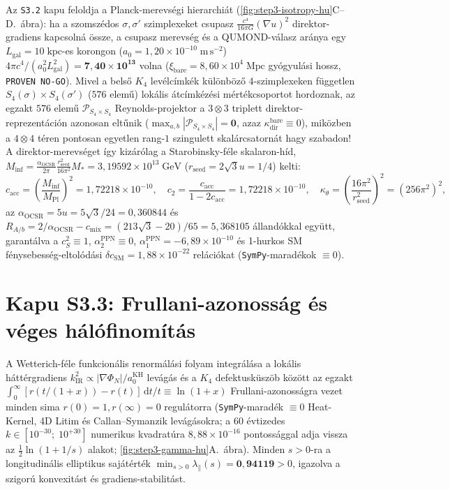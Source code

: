 \documentclass[11pt,a4paper]{article}
\begin{document}
Az \texttt{S3.2} kapu feloldja a Planck-merevségi hierarchiát (\ref{fig:step3-isotropy-hu}C--D.~ábra): ha a szomszédos $\sigma, \sigma'$ szimplexeket csupasz $\frac{c^4}{16\pi G}(\nabla u)^2$ direktor-gradiens kapcsolná össze, a csupasz merevség és a QUMOND-válasz aránya egy $L_{\mathrm{gal}} = 10\;\mathrm{kpc}$-es korongon ($a_0 = 1{,}20\times 10^{-10}\;\mathrm{m\,s^{-2}}$) $4\pi c^4/(a_0^2 L_{\mathrm{gal}}^2) = \mathbf{7{,}40\times 10^{13}}$ volna ($\xi_{\mathrm{bare}} = 8{,}60\times 10^4\;\mathrm{Mpc}$ gyógyulási hossz, \texttt{PROVEN NO-GO}). Mivel a belső $K_4$ levélcímkék különböző 4-szimplexeken független $S_4(\sigma)\times S_4(\sigma')$ ($576$ elemű) lokális átcímkézési mértékcsoportot hordoznak, az egzakt $576$ elemű $\mathcal{P}_{S_4\times S_4}$ Reynolds-projektor a $3\otimes 3$ triplett direktor-reprezentáción azonosan eltűnik ($\max_{a,b}|\mathcal{P}_{S_4\times S_4}| = \mathbf{0}$, azaz $\kappa_{\mathrm{dir}}^{\mathrm{bare}} \equiv 0$), miközben a $4\otimes 4$ téren pontosan egyetlen rang-$1$ szingulett skalárcsatornát hagy szabadon! A direktor-merevséget így kizárólag a Starobinsky-féle skalaron-híd, $M_{\mathrm{inf}} = \frac{\alpha_{\mathrm{OCSR}}}{2\pi}\frac{r_{\mathrm{seed}}^2}{16\pi^2}M_* = 3{,}19592\times 10^{13}\;\mathrm{GeV}$ ($r_{\mathrm{seed}} = 2\sqrt{3}u = 1/4$) kelti:
\begin{equation}
    c_{\mathrm{acc}} = \left(\frac{M_{\mathrm{inf}}}{M_{\mathrm{Pl}}}\right)^{\!2} = 1{,}72218\times 10^{-10}, \quad c_2 = \frac{c_{\mathrm{acc}}}{1 - 2c_{\mathrm{acc}}} = 1{,}72218\times 10^{-10}, \quad \kappa_\theta = \left(\frac{16\pi^2}{r_{\mathrm{seed}}^2}\right)^{\!2} = (256\pi^2)^2,
    \label{eq:derived-couplings-hu}
\end{equation}
az $\alpha_{\mathrm{OCSR}} = 5u = 5\sqrt{3}/24 = 0{,}360844$ és $R_{A/b} = 2/\alpha_{\mathrm{OCSR}} - c_{\mathrm{mix}} = (213\sqrt{3}-20)/65 = 5{,}368105$ állandókkal együtt, garantálva a $c_S^2 \equiv 1$, $\alpha_2^{\mathrm{PPN}} \equiv 0$, $\alpha_1^{\mathrm{PPN}} = -6{,}89\times 10^{-10}$ és 1-hurkos SM fénysebesség-eltolódási $\delta c_{\mathrm{SM}} = 1{,}88\times 10^{-22}$ relációkat (\texttt{SymPy}-maradékok $\equiv 0$).

\section{Kapu S3.3: Frullani-azonosság és véges hálófinomítás}
\label{sec:step3-gamma-hu}
A Wetterich-féle funkcionális renormálási folyam \cite{Wetterich1993} integrálása a lokális háttérgradiens $k_{\mathrm{IR}}^2 \propto |\nabla\Phi_N|/a_0^{\mathrm{KH}}$ levágás és a $K_4$ defektusküszöb között az egzakt $\int_0^\infty [r(t/(1+x)) - r(t)]\,\mathrm{d}t/t \equiv \ln(1+x)$ Frullani-azonosságra vezet minden sima $r(0)=1, r(\infty)=0$ regulátorra (\texttt{SymPy}-maradék $\equiv 0$ Heat-Kernel, 4D Litim és Callan--Symanzik levágásokra; a 60 évtizedes $k \in [10^{-30};\; 10^{+30}]$ numerikus kvadratúra $8{,}88\times 10^{-16}$ pontossággal adja vissza az $\frac{1}{2}\ln(1 + 1/s)$ alakot; \ref{fig:step3-gamma-hu}A.~ábra). Minden $s > 0$-ra a longitudinális elliptikus sajátérték $\min_{s>0}\lambda_\parallel(s) = \mathbf{0{,}94119} > 0$, igazolva a szigorú konvexitást és gradiens-stabilitást.
\end{document}
